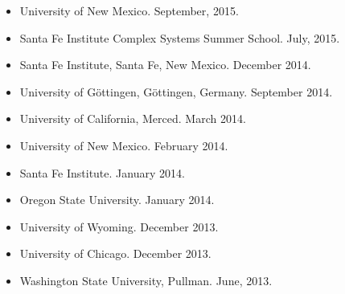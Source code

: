 \documentclass[margin,line,12pt]{res}
\begin{document}
\begin{resume}
\begin{itemize}
\item University of New Mexico. September, 2015.

\item Santa Fe Institute Complex Systems Summer School. July, 2015.

\item Santa Fe Institute, Santa Fe, New Mexico. December 2014.

\item University of G\"ottingen, G\"ottingen, Germany. September 2014.

\item University of California, Merced. March 2014.

\item University of New Mexico. February 2014.

\item Santa Fe Institute. January 2014.

\item Oregon State University. January 2014.

\item University of Wyoming. December 2013.

\item University of Chicago. December 2013.

\item Washington State University, Pullman. June, 2013.


\end{itemize}
\end{resume}
\end{document}

